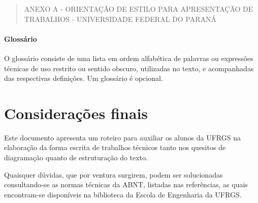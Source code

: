 \documentclass[repeatfields,xlists,xpacks,oneside,yearsonly]{ufrgscca}
\begin{document}
\begin{quote}ANEXO A - ORIENTAÇÃO DE ESTILO PARA APRESENTAÇÃO DE TRABALHOS - UNIVERSIDADE FEDERAL DO PARANÁ\\\end{quote}

\subsubsection{Glossário}

O glossário consiste de uma lista em ordem alfabética de palavras ou
expressões técnicas de uso restrito ou sentido obscuro, utilizadas no texto,
e acompanhadas das respectivas definições. Um glossário é opcional.


\chapter{Considerações finais}
\label{conclusao}

Este documento apresenta um roteiro para auxiliar os
alunos da UFRGS na elaboração da forma escrita de trabalhos técnicos
tanto nos quesitos de diagramação quanto de
estruturação do texto.

Quaisquer dúvidas, que por ventura surgirem, podem ser solucionadas
consultando-se as normas técnicas da ABNT, listadas nas referências, as
quais encontram-se disponíveis na biblioteca da Escola de Engenharia da
UFRGS.

\printbibliography
\end{document}
